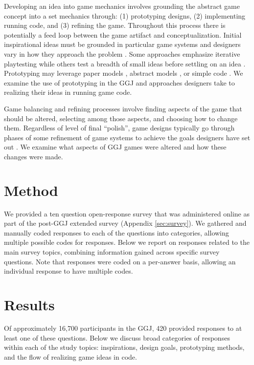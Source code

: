 \documentclass{sig-alternate}
\begin{document}
Developing an idea into game mechanics involves grounding the abstract game concept into a set mechanics through: (1) prototyping designs, (2) implementing running code, and (3) refining the game. Throughout this process there is potentially a feed loop between the game artifact and conceptualization. Initial inspirational ideas must be grounded in particular game systems and designers vary in how they approach the problem \cite{gabler2005:7day-prototype} \cite{manker2011:prototyping} \cite{nelson2009:reqanal}. Some approaches emphasize iterative playtesting \cite{fullerton2008:playcentric} \cite{schell2008:gamedesign} while others test a breadth of small ideas before settling on an idea \cite{gabler2005:7day-prototype}. Prototyping may leverage paper models \cite{manker2011:prototyping}, abstract models \cite{nelson2009:reqanal} \cite{dormans2011:machinations2}, or simple code \cite{gabler2005:7day-prototype}. We examine the use of prototyping in the GGJ and approaches designers take to realizing their ideas in running game code.

Game balancing and refining processes involve finding aspects of the game that should be altered, selecting among those aspects, and choosing how to change them. Regardless of level of final ``polish'', game designs typically go through phases of some refinement of game systems to achieve the goals designers have set out \cite{schell2008:gamedesign} \cite{fullerton2008:playcentric}. We examine what aspects of GGJ games were altered and how these changes were made.

\section{Method}
We provided a ten question open-response survey that was administered online as part of the post-GGJ extended survey (Appendix \ref{sec:survey}). We gathered and manually coded responses to each of the questions into categories, allowing multiple possible codes for responses. Below we report on responses related to the main survey topics, combining information gained across specific survey questions. Note that responses were coded on a per-answer basis, allowing an individual response to have multiple codes.


\section{Results}
Of approximately 16,700 participants in the GGJ, 420 provided responses to at least one of these questions.
Below we discuss broad categories of responses within each of the study topics: inspirations, design goals, prototyping methods, and the flow of realizing game ideas in code.
\end{document}
